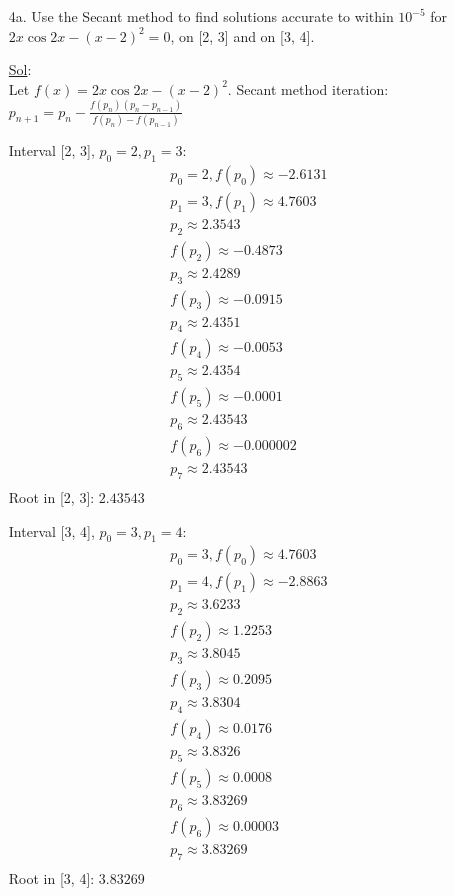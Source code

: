 \begin{enumerate}
  \item[4a.] Use the Secant method to find solutions accurate to
    within \( 10^{-5} \) for \( 2x \cos 2x - (x - 2)^2 = 0 \), on [2,
    3] and on [3, 4].

    \underline{Sol}:\\
    Let \( f(x) = 2x \cos 2x - (x - 2)^2 \).
    Secant method iteration: \( p_{n+1} = p_n - \frac{f(p_n)(p_n -
    p_{n-1})}{f(p_n) - f(p_{n-1})} \)

    Interval [2, 3], \( p_0 = 2, p_1 = 3 \):
    \[
      \begin{array}{l}
        p_0 = 2, f(p_0) \approx -2.6131 \\
        p_1 = 3, f(p_1) \approx 4.7603 \\
        p_2 \approx 2.3543 \\
        f(p_2) \approx -0.4873 \\
        p_3 \approx 2.4289 \\
        f(p_3) \approx -0.0915 \\
        p_4 \approx 2.4351 \\
        f(p_4) \approx -0.0053 \\
        p_5 \approx 2.4354 \\
        f(p_5) \approx -0.0001 \\
        p_6 \approx 2.43543 \\
        f(p_6) \approx -0.000002 \\
        p_7 \approx 2.43543 \\
      \end{array}
    \]
    Root in [2, 3]: \( \boxed{2.43543} \)

    Interval [3, 4], \( p_0 = 3, p_1 = 4 \):
    \[
      \begin{array}{l}
        p_0 = 3, f(p_0) \approx 4.7603 \\
        p_1 = 4, f(p_1) \approx -2.8863 \\
        p_2 \approx 3.6233 \\
        f(p_2) \approx 1.2253 \\
        p_3 \approx 3.8045 \\
        f(p_3) \approx 0.2095 \\
        p_4 \approx 3.8304 \\
        f(p_4) \approx 0.0176 \\
        p_5 \approx 3.8326 \\
        f(p_5) \approx 0.0008 \\
        p_6 \approx 3.83269 \\
        f(p_6) \approx 0.00003 \\
        p_7 \approx 3.83269 \\
      \end{array}
    \]
    Root in [3, 4]: \( \boxed{3.83269} \)


\end{enumerate}
